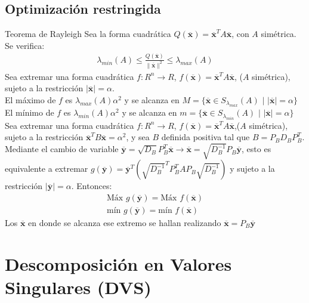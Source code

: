 \documentclass[a4paper, twoside]{article}
\numberwithin{equation}{section}
\numberwithin{figure}{section}
\numberwithin{table}{section}
\newcommand{\vect}[1]{\overline{\textbf{#1}}}
\begin{document}
\subsection{Optimización restringida}
\begin{teorema*}{Teorema de Rayleigh}
	Sea la forma cuadrática $Q(\vect{x})=\vect{x}^T A \vect{x}$, con $A$ simétrica. Se verifica:
	\begin{align}
		\lambda_{min}(A) \leq \frac{Q(\vect{x})}{\parallel \vect{x} \parallel^2} \leq \lambda_{max}(A)
	\end{align}
	Sea extremar una forma cuadrática $f:R^n \to R$, $f(\vect{x})=\vect{x}^T A \vect{x}$, ($A$ simétrica), sujeto a la restricción $\vert \vect{x} \vert=\alpha$.\\
	
	El máximo de $f$ es $\lambda_{max}(A) \alpha^2$ y se alcanza en $M=\{ \vect{x} \in S_{\lambda_{max}}(A)$ $\vert$ $ \vert \vect{x} \vert =\alpha \}$ \\
	
	El mínimo de $f$ es $\lambda_{min}(A) \alpha^2$ y se alcanza en $m=\{ \vect{x} \in S_{\lambda_{min}}(A)$ $\vert$ $ \vert \vect{x} \vert =\alpha \}$ \\
	
	Sea extremar una forma cuadrática $f:R^n \to R$, $f(\vect{x})=\vect{x}^T A \vect{x}$,($A$ simétrica), sujeto a la restricción $\vect{x}^T B \vect{x}=\alpha^2$, y sea $B$ definida positiva tal que $B=P_B D_B P_B^T$. Mediante el cambio de variable $\vect{y}=\sqrt{D_B}P_B^T \vect{x} \rightarrow \vect{x}=\sqrt{D_B^{-1}}P_B \vect{y}$, esto es equivalente a extremar $g(\vect{y})=\vect{y}^T \left(\sqrt{D_B^{-1}}^T P_B^T A P_B \sqrt{D_B^{-1}} \right)$ y sujeto a la restricción $\vert \vect{y} \vert=\alpha$. Entonces:
	\begin{align}
		\text{Máx }g(\vect{y})=\text{Máx }f(\vect{x}) \\
		\text{mín }g(\vect{y})=\text{mín }f(\vect{x})
	\end{align}
	Los $\vect{x}$ en donde se alcanza ese extremo se hallan realizando $\vect{x}=P_B \vect{y}$
\end{teorema*}

\newpage
\section{Descomposición en Valores Singulares (DVS)}
\end{document}
